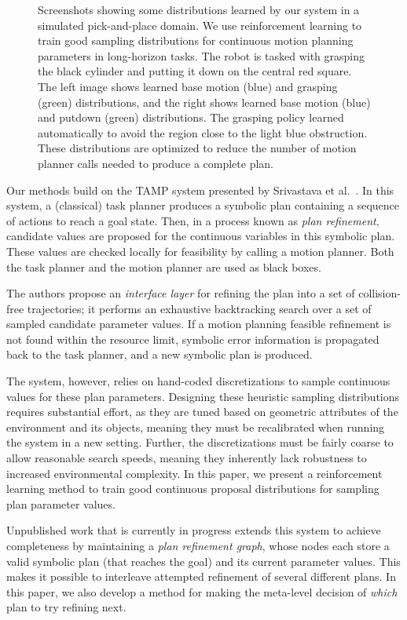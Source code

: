 \begin{figure}[t]
  \caption{Screenshots showing some distributions learned by our system in a simulated pick-and-place
    domain. We use reinforcement learning to train good sampling distributions for continuous motion
    planning parameters in long-horizon tasks. The robot is tasked with grasping the black cylinder and putting it down on the
    central red square. The left image shows learned base motion (blue) and grasping (green) distributions,
    and the right shows learned base motion (blue) and putdown (green) distributions. The grasping policy
    learned automatically to avoid the region close to the light blue obstruction. These distributions are
    optimized to reduce the number of motion planner calls needed to produce a complete plan.}
  \label{fig:cover}
\end{figure}

Our methods build on the TAMP system presented by Srivastava et al.~\cite{srivastava2014combined}.
In this system, a (classical) task planner produces a symbolic plan containing
a sequence of actions to reach a goal state. Then, in a process known as \emph{plan refinement},
candidate values are proposed for the continuous variables in this symbolic plan.
These values are checked locally for feasibility by calling a motion planner.
Both the task planner and the motion planner are used as black boxes.

The authors propose an \emph{interface layer} for refining the plan into a set
of collision-free trajectories; it performs an exhaustive backtracking search over a
set of sampled candidate parameter values. If a motion planning feasible
refinement is not found within the resource limit, symbolic error information is
propagated back to the task planner, and a new symbolic plan is produced.

The system, however, relies on hand-coded discretizations to sample continuous values for these
plan parameters. Designing these heuristic sampling distributions requires substantial effort,
as they are tuned based on geometric attributes of the environment and its objects, meaning they
must be recalibrated when running the system in a new setting. Further,
the discretizations must be fairly coarse to allow reasonable search speeds, meaning they inherently lack
robustness to increased environmental complexity. In this paper, we present a reinforcement
learning method to train good continuous proposal distributions for sampling plan parameter values.

Unpublished work that is currently in progress extends this system to achieve completeness by
maintaining a \emph{plan refinement graph}, whose nodes each store a valid
symbolic plan (that reaches the goal) and its current parameter values. This makes it possible to interleave attempted refinement of several
different plans. In this paper, we also develop a method for making the meta-level decision of
\emph{which} plan to try refining next.

